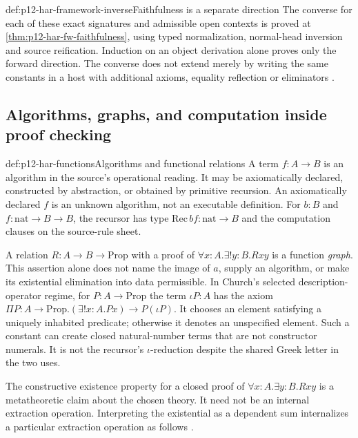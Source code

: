 \begin{proofboundary}{def:p12-har-framework-inverse}{Faithfulness is a separate direction}
The converse for each of these exact signatures and admissible open contexts
is proved at \cref{thm:p12-har-fw-faithfulness}, using typed normalization,
normal-head inversion and source reification. Induction on an object
derivation alone proves only the forward direction. The converse does not
extend merely by writing the same constants in a host with additional
axioms, equality reflection or eliminators
\cite[pp.~1161--1163]{BarendregtGeuvers2001}.
\end{proofboundary}



\subsection{Algorithms, graphs, and computation inside proof checking}

\begin{hbdefinition}{def:p12-har-functions}{Algorithms and functional relations}
A term \(f:A\to B\) is an algorithm in the source's operational reading.
It may be axiomatically declared, constructed by abstraction, or obtained by
primitive recursion. An axiomatically declared \(f\) is an unknown
algorithm, not an executable definition. For \(b:B\) and
\(f:\mathrm{nat}\to B\to B\), the recursor has type
\(\mathrm{Rec}\,b f:\mathrm{nat}\to B\) and the computation
clauses on the source-rule sheet.

A relation \(R:A\to B\to\mathrm{Prop}\) with a proof of
\(\forall x:A.\exists!y:B.Rxy\) is a function \emph{graph}.
This assertion alone does not name the image of \(a\), supply an
algorithm, or make its existential elimination into data permissible.
In Church's selected description-operator regime, for
\(P:A\to\mathrm{Prop}\) the term \(\iota P:A\) has the axiom
\(\Pi P:A\to\mathrm{Prop}.(\exists!x:A.Px)\to P(\iota P)\).
It chooses an element satisfying a uniquely inhabited predicate;
otherwise it denotes an unspecified element. Such a
constant can create closed natural-number terms that are not constructor
numerals. It is not the recursor's \(\iota\)-reduction despite the shared
Greek letter in the two uses.

The constructive existence property for a closed proof of
\(\forall x:A.\exists y:B.Rxy\) is a metatheoretic claim about the
chosen theory. It need not be an internal extraction operation. Interpreting
the existential as a dependent sum internalizes a particular extraction
operation as follows \cite[pp.~1164--1165]{BarendregtGeuvers2001}.
\end{hbdefinition}

